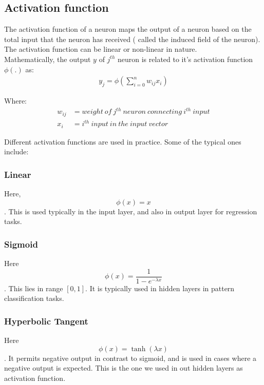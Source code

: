 \documentclass[12pt, onecolumn]{extarticle}
\begin{document}
 	\subsection{\textbf{Activation function}} The activation function of a neuron maps the output of a neuron based on the total input that the neuron has received ( called the induced field of the neuron). The activation function can be linear or non-linear in nature. \\ Mathematically, the output $ y $ of $ j^{th} $ neuron is related to it's activation function $ \phi(.) $ as:  \begin{align}
 	\label{eq:MLP_act_func}
	y_{j} = \phi(\sum_{i=0}^{n}w_{ij}x_{i})
 	\end{align}
 	
 	Where: \begin{align*}
 	w_{ij} &= weight \: of \: j^{th} \: neuron \: connecting \: i^{th} \: input \\
 	x_{i} &= i^{th} \: input \: in \: the \: input \: vector
 	\end{align*}
 	
 	Different activation functions are used in practice. Some of the typical ones include: \\
 	\subsubsection{Linear} Here, $$ \phi(x) = x $$. This is used typically in the input layer, and also in output layer for regression tasks. \\
 	
 	\subsubsection{Sigmoid} Here $$ \phi(x) = \frac{1}{1-e^{-\lambda x}} $$. This lies in range $ [0, 1] $. It is typically used in hidden layers in pattern classification tasks. \\
 	
 	\subsubsection{Hyperbolic Tangent} Here $$ \phi(x) = \tanh(\lambda x) $$. It permits negative output in contrast to sigmoid, and is used in cases where a negative output is expected. This is the one we used in out hidden layers as activation function.\\ \\ 
 	
\end{document}
